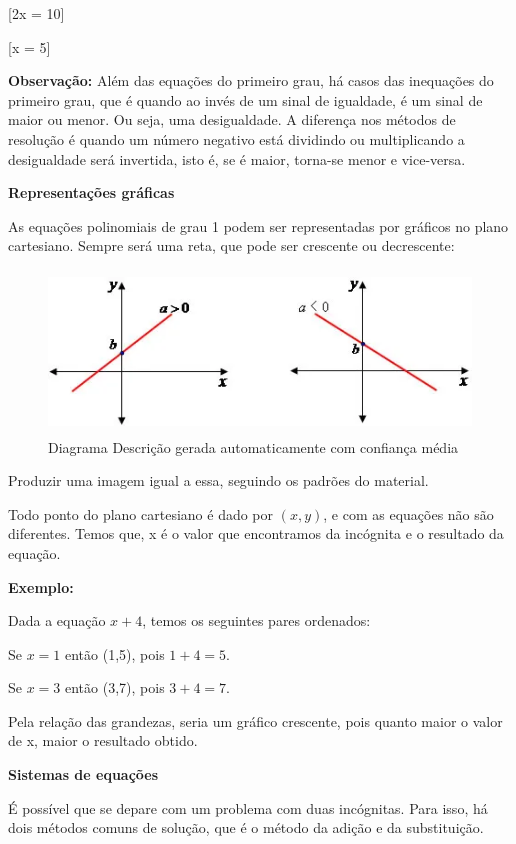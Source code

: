 [2x = 10]

[x = 5]

\textbf{Observação:} Além das equações do primeiro grau, há casos das
inequações do primeiro grau, que é quando ao invés de um sinal de
igualdade, é um sinal de maior ou menor. Ou seja, uma desigualdade. A
diferença nos métodos de resolução é quando um número negativo está
dividindo ou multiplicando a desigualdade será invertida, isto é, se é
maior, torna-se menor e vice-versa.

\textbf{Representações gráficas}

As equações polinomiais de grau 1 podem ser representadas por gráficos
no plano cartesiano. Sempre será uma reta, que pode ser crescente ou
decrescente:

\begin{figure}
\centering
\includegraphics[width=4.82292in,height=1.69792in]{./imgSAEB_7_MAT/media/image17.png}
\caption{Diagrama Descrição gerada automaticamente com confiança média}
\end{figure}

Produzir uma imagem igual a essa, seguindo os padrões do material.

Todo ponto do plano cartesiano é dado por \((x,y)\), e com as equações
não são diferentes. Temos que, x é o valor que encontramos da incógnita
e o resultado da equação.

\textbf{Exemplo:}

Dada a equação \(x + 4\), temos os seguintes pares ordenados:

Se \(x = 1\) então (1,5), pois \(1 + 4 = 5.\)

Se \(x = 3\) então (3,7), pois \(3 + 4 = 7\).

Pela relação das grandezas, seria um gráfico crescente, pois quanto
maior o valor de x, maior o resultado obtido.

\textbf{Sistemas de equações}

É possível que se depare com um problema com duas incógnitas. Para isso,
há dois métodos comuns de solução, que é o método da adição e da
substituição.

